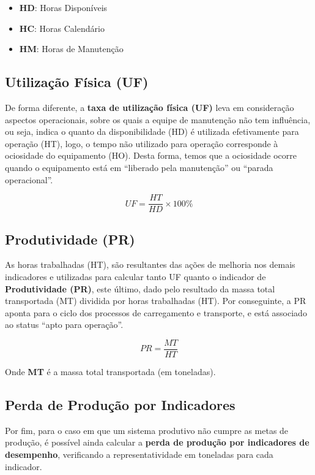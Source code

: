 \documentclass[
  letterpaper,
]{book}
\providecommand{\tightlist}{%
  \setlength{\itemsep}{0pt}\setlength{\parskip}{0pt}}\usepackage{longtable,booktabs,array}
\begin{document}
\begin{itemize}
\tightlist
\item
  \textbf{HD}: Horas Disponíveis
\item
  \textbf{HC}: Horas Calendário
\item
  \textbf{HM}: Horas de Manutenção
\end{itemize}

\subsection{Utilização Física (UF)}\label{utilizauxe7uxe3o-fuxedsica-uf}

De forma diferente, a \textbf{taxa de utilização física (UF)} leva em
consideração aspectos operacionais, sobre os quais a equipe de
manutenção não tem influência, ou seja, indica o quanto da
disponibilidade (HD) é utilizada efetivamente para operação (HT), logo,
o tempo não utilizado para operação corresponde à ociosidade do
equipamento (HO). Desta forma, temos que a ociosidade ocorre quando o
equipamento está em ``liberado pela manutenção'' ou ``parada
operacional''.

\[
UF = \frac{HT}{HD} \times 100\%
\]

\subsection{Produtividade (PR)}\label{produtividade-pr}

As horas trabalhadas (HT), são resultantes das ações de melhoria nos
demais indicadores e utilizadas para calcular tanto UF quanto o
indicador de \textbf{Produtividade (PR)}, este último, dado pelo
resultado da massa total transportada (MT) dividida por horas
trabalhadas (HT). Por conseguinte, a PR aponta para o ciclo dos
processos de carregamento e transporte, e está associado ao status
``apto para operação''.

\[
PR = \frac{MT}{HT}
\]

Onde \textbf{MT} é a massa total transportada (em toneladas).

\subsection{Perda de Produção por Indicadores}\label{sec-perda-producao}

Por fim, para o caso em que um sistema produtivo não cumpre as metas de
produção, é possível ainda calcular a \textbf{perda de produção por
indicadores de desempenho}, verificando a representatividade em
toneladas para cada indicador.
\end{document}
